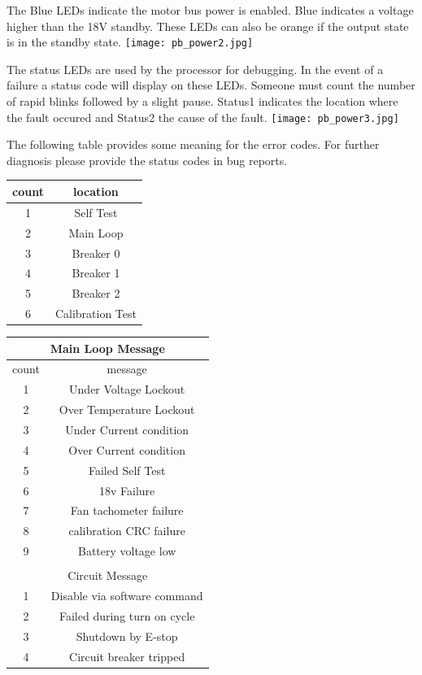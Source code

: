 The Blue LEDs indicate the motor bus power is enabled. Blue indicates a voltage higher than the 18V standby. These LEDs can also be orange if the output state is in the standby state.
\texttt{[image: pb\_power2.jpg]}

The status LEDs are used by the processor for debugging. In the event of a failure a status code will display on these LEDs. Someone must count the number of rapid blinks followed by a slight pause.
Status1 indicates the location where the fault occured and Status2 the cause of the fault.
\texttt{[image: pb\_power3.jpg]}

The following table provides some meaning for the error codes. For further diagnosis please provide the status codes in bug reports.

\begin{tabular}{|c|c|}
\hline
count & location \\
\hline
\hline
1 & Self Test \\
\hline
2 & Main Loop \\
\hline
3 & Breaker 0 \\
\hline
4 & Breaker 1 \\
\hline
5 & Breaker 2 \\
\hline
6 & Calibration Test \\
\hline
\end{tabular}

\begin{tabular}{c|c|}
\hline
\multicolumn{2}{|c|}{Main Loop Message} \\
\hline
count &  message \\
\hline
\hline
1 & Under Voltage Lockout \\
\hline
2 & Over Temperature Lockout \\
\hline
3 & Under Current condition \\
\hline
4 & Over Current condition \\
\hline
5 & Failed Self Test \\
\hline
6 & 18v Failure \\
\hline
7 & Fan tachometer failure \\
\hline
8 & calibration CRC failure \\
\hline
9 & Battery voltage low  \\
\hline
& \\
\hline
\multicolumn{2}{|c|}{Circuit Message} \\
\hline
1 & Disable via software command \\
\hline
2 & Failed during turn on cycle \\
\hline
3 & Shutdown by E-stop \\
\hline
4 & Circuit breaker tripped  \\
\hline
\end{tabular}

